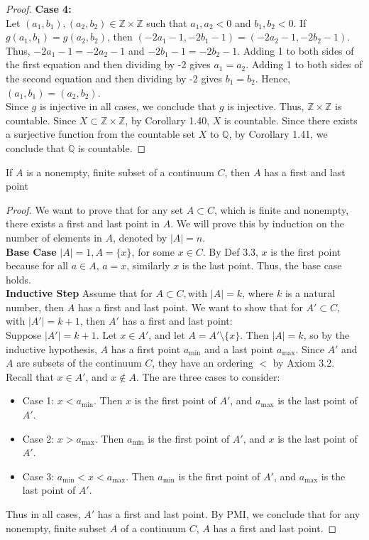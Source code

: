 \documentclass[11pt]{article}
\begin{document}
\begin{proof}
\textbf{Case 4:} \\ Let $(a_1,b_1), (a_2,b_2) \in \mathbb{Z} \times \mathbb{Z}$ such that $a_1, a_2 < 0$ and $b_1, b_2 < 0$. If $g(a_1,b_1) = g(a_2,b_2)$, then $(-2a_1 - 1, -2b_1 - 1) = (-2a_2 - 1, -2b_2 - 1)$. Thus, $-2a_1 - 1 = -2a_2 - 1$ and $-2b_1 - 1 = -2b_2 - 1$. Adding 1 to both sides of the first equation and then dividing by -2 gives $a_1 = a_2$. Adding 1 to both sides of the second equation and then dividing by -2 gives $b_1 = b_2$. Hence, $(a_1,b_1) = (a_2,b_2)$. 
\\[4pt]
\noindent Since $g$ is injective in all cases, we conclude that $g$ is injective. Thus, $\mathbb{Z} \times \mathbb{Z}$ is countable. Since $X \subset \mathbb{Z} \times \mathbb{Z}$, by Corollary 1.40, $X$ is countable. Since there exists a surjective function from the countable set $X$ to $\mathbb{Q}$, by Corollary 1.41, we conclude that $\mathbb{Q}$ is countable.
\end{proof}

\begin{lemma}[3.4]
If $A$ is a nonempty, finite subset of a continuum $C$, then $A$ has a first and last point
\end{lemma}
\begin{proof}
We want to prove that for any set $A \subset C$, which is finite and nonempty, there exists a first and last point in $A$.
We will prove this by induction on the number of elements in $A$, denoted by $|A| = n$. \\
\textbf{Base Case} $|A| = 1, A = \{x\}$, for some $x \in C$. By Def 3.3, $x$ is the first point because for all $a \in A$, $a = x$, similarly $x$ is the last point. Thus, the base case holds. \\
\textbf{Inductive Step} Assume that for $A\subset C, $with $|A| = k$, where $k$ is a natural number, then $A$ has a first and last point. We want to show that for $A' \subset C,$ with $|A'| = k+1$, then $A'$ has a first and last point: \\
Suppose $|A'| = k+1$. Let $x \in A'$, and let $A = A' \setminus \{x\}$. Then $|A| = k$, so by the inductive hypothesis, $A$ has a first point $a_{\text{min}}$ and a last point $a_{\text{max}}$. Since $A'$ and $A$ are subsets of the continuum $C$, they have an ordering $<$ by Axiom 3.2. Recall that $x \in A'$, and $x \notin A$. The are three cases to consider:
\begin{itemize}
    \item Case 1: $x < a_{\text{min}}$. Then $x$ is the first point of $A'$, and $a_{\text{max}}$ is the last point of $A'$.
    \item Case 2: $x > a_{\text{max}}$. Then $a_{\text{min}}$ is the first point of $A'$, and $x$ is the last point of $A'$.
    \item Case 3: $a_{\text{min}} < x < a_{\text{max}}$. Then $a_{\text{min}}$ is the first point of $A'$, and $a_{\text{max}}$ is the last point of $A'$.
\end{itemize}
Thus in all cases, $A'$ has a first and last point. By PMI, we conclude that for any nonempty, finite subset $A$ of a continuum $C$, $A$ has a first and last point.
\end{proof}
\end{document}

